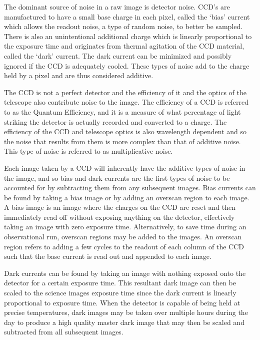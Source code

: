 The dominant source of noise in a raw image is detector noise. \gls{CCD}'s are manufactured to have a small base charge in each pixel, called the `bias' current which allows the readout noise, a type of random noise, to better be sampled. There is also an unintentional additional charge which is linearly proportional to the exposure time and originates from thermal agitation of the \gls{CCD} material, called the `dark' current. The dark current can be minimized and possibly ignored if the \gls{CCD} is adequately cooled. These types of noise add to the charge held by a pixel and are thus considered additive.
\prgph

The \gls{CCD} is not a perfect detector and the efficiency of it and the optics of the telescope also contribute noise to the image. The efficiency of a \gls{CCD} is referred to as the Quantum Efficiency, and it is a measure of what percentage of light striking the detector is actually recorded and converted to a charge. The efficiency of the \gls{CCD} and telescope optics is also wavelength dependent and so the noise that results from them is more complex than that of additive noise. This type of noise is referred to as multiplicative noise.
\prgph

Each image taken by a \gls{CCD} will inherently have the additive types of noise in the image, and so bias and dark currents are the first types of noise to be accounted for by subtracting them from any subsequent images. Bias currents can be found by taking a bias image or by adding an overscan region to each image. A bias image is an image where the charges on the \gls{CCD} are reset and then immediately read off without exposing anything on the detector, effectively taking an image with zero exposure time. Alternatively, to save time during an observational run, overscan regions may be added to the images. An overscan region refers to adding a few cycles to the readout of each column of the \gls{CCD} such that the base current is read out and appended to each image.
\prgph

Dark currents can be found by taking an image with nothing exposed onto the detector for a certain exposure time. This resultant dark image can then be scaled to the science images exposure time since the dark current is linearly proportional to exposure time. When the detector is capable of being held at precise temperatures, dark images may be taken over multiple hours during the day to produce a high quality master dark image that may then be scaled and subtracted from all subsequent images.
\prgph

